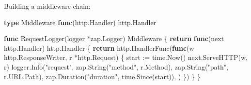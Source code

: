 \documentclass[
]{article}
\newenvironment{Shaded}{}{}
\newcommand{\ControlFlowTok}[1]{\textcolor[rgb]{0.00,0.44,0.13}{\textbf{#1}}}
\newcommand{\KeywordTok}[1]{\textcolor[rgb]{0.00,0.44,0.13}{\textbf{#1}}}
\newcommand{\NormalTok}[1]{#1}
\newcommand{\OperatorTok}[1]{\textcolor[rgb]{0.40,0.40,0.40}{#1}}
\newcommand{\StringTok}[1]{\textcolor[rgb]{0.25,0.44,0.63}{#1}}
\begin{document}
Building a middleware chain:

\begin{Shaded}
\begin{Highlighting}[]
\KeywordTok{type}\NormalTok{ Middleware }\KeywordTok{func}\OperatorTok{(}\NormalTok{http}\OperatorTok{.}\NormalTok{Handler}\OperatorTok{)}\NormalTok{ http}\OperatorTok{.}\NormalTok{Handler}

\KeywordTok{func}\NormalTok{ RequestLogger}\OperatorTok{(}\NormalTok{logger }\OperatorTok{*}\NormalTok{zap}\OperatorTok{.}\NormalTok{Logger}\OperatorTok{)}\NormalTok{ Middleware }\OperatorTok{\{}
    \ControlFlowTok{return} \KeywordTok{func}\OperatorTok{(}\NormalTok{next http}\OperatorTok{.}\NormalTok{Handler}\OperatorTok{)}\NormalTok{ http}\OperatorTok{.}\NormalTok{Handler }\OperatorTok{\{}
        \ControlFlowTok{return}\NormalTok{ http}\OperatorTok{.}\NormalTok{HandlerFunc}\OperatorTok{(}\KeywordTok{func}\OperatorTok{(}\NormalTok{w http}\OperatorTok{.}\NormalTok{ResponseWriter}\OperatorTok{,}\NormalTok{ r }\OperatorTok{*}\NormalTok{http}\OperatorTok{.}\NormalTok{Request}\OperatorTok{)} \OperatorTok{\{}
\NormalTok{            start }\OperatorTok{:=}\NormalTok{ time}\OperatorTok{.}\NormalTok{Now}\OperatorTok{()}
\NormalTok{            next}\OperatorTok{.}\NormalTok{ServeHTTP}\OperatorTok{(}\NormalTok{w}\OperatorTok{,}\NormalTok{ r}\OperatorTok{)}
\NormalTok{            logger}\OperatorTok{.}\NormalTok{Info}\OperatorTok{(}\StringTok{"request"}\OperatorTok{,}
\NormalTok{                zap}\OperatorTok{.}\NormalTok{String}\OperatorTok{(}\StringTok{"method"}\OperatorTok{,}\NormalTok{ r}\OperatorTok{.}\NormalTok{Method}\OperatorTok{),}
\NormalTok{                zap}\OperatorTok{.}\NormalTok{String}\OperatorTok{(}\StringTok{"path"}\OperatorTok{,}\NormalTok{ r}\OperatorTok{.}\NormalTok{URL}\OperatorTok{.}\NormalTok{Path}\OperatorTok{),}
\NormalTok{                zap}\OperatorTok{.}\NormalTok{Duration}\OperatorTok{(}\StringTok{"duration"}\OperatorTok{,}\NormalTok{ time}\OperatorTok{.}\NormalTok{Since}\OperatorTok{(}\NormalTok{start}\OperatorTok{)),}
            \OperatorTok{)}
        \OperatorTok{\})}
    \OperatorTok{\}}
\OperatorTok{\}}


\end{Highlighting}
\end{Shaded}
\end{document}
